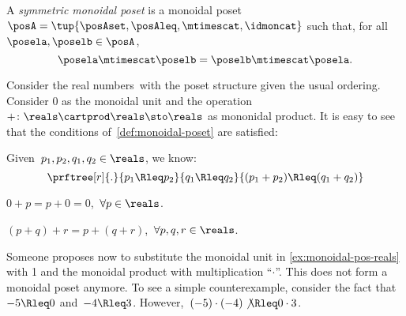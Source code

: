 \begin{ctdefinition}
    \label{def:sym-monoidal-poset}
    A \emph{symmetric monoidal poset} is a monoidal poset~$\posA=\tup{\posAset, \posAleq, \mtimescat, \idmoncat}$ such that, for all~$\posela, \poselb \in \posA$,
    \begin{equation}
        \posela \mtimescat \poselb = \poselb \mtimescat \posela.
    \end{equation}
\end{ctdefinition}

\begin{example}
    \label{ex:monoidal-pos-reals}
    Consider the real numbers~\reals with the poset structure given the usual ordering.
    Consider 0 as the monoidal unit and the operation~$+\colon \reals\cartprod \reals\sto \reals$ as mononidal product.
    It is easy to see that the conditions of~\cref{def:monoidal-poset} are satisfied:
    \begin{compactenum}[(a)]
        \item Given~$p_1,p_2,q_1,q_2\in \reals$, we know:
              \begin{equation*}
                  \prftree[r]{.
                  }{
                      p_1\Rleq  p_2
                  }{
                      q_1\Rleq  q_2
                  }{
                      (p_1+p_2) \Rleq  (q_1+q_2)
                  }
              \end{equation*}
        \item $0+p=p+0=0$,~$\forall p\in \reals$.
        \item $(p+q)+r=p+(q+r)$,~$\forall p,q,r\in \reals$.
    \end{compactenum}
\end{example}

\begin{counterexample}
    Someone proposes now to substitute the monoidal unit in \cref{ex:monoidal-pos-reals} with 1 and the monoidal product with multiplication ``$\cdot$''.
    This does not form a monoidal poset anymore.
    To see a simple counterexample, consider the fact that~$-5\Rleq 0$ and~$-4\Rleq 3$.
    However,~$(-5)\cdot (-4) \not{\Rleq} 0 \cdot 3$.
\end{counterexample}

